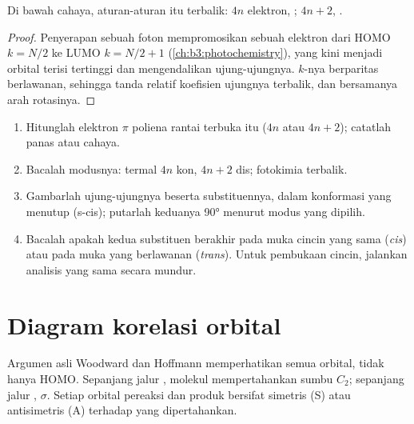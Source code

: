 \begin{proposition}\label{prop:b3:pericyclic:photo-electrocyclic}
Di bawah cahaya, aturan-aturan itu terbalik: $4n$ elektron, ; $4n + 2$, .
\end{proposition}

\begin{proof}
Penyerapan sebuah foton mempromosikan sebuah elektron dari HOMO $k = N/2$ ke LUMO $k = N/2 + 1$
(\cref{ch:b3:photochemistry}), yang kini menjadi orbital terisi tertinggi dan
mengendalikan ujung-ujungnya. $k$-nya berparitas berlawanan, sehingga tanda relatif koefisien
ujungnya terbalik, dan bersamanya arah rotasinya.
\end{proof}

\begin{method}\label{met:b3:pericyclic:predict-stereo}
\begin{enumerate}
  \item Hitunglah elektron $\pi$ poliena rantai terbuka itu ($4n$ atau $4n + 2$); catatlah panas atau
        cahaya.
  \item Bacalah modusnya: termal $4n$ kon, $4n + 2$ dis; fotokimia terbalik.
  \item Gambarlah ujung-ujungnya beserta substituennya, dalam konformasi yang
        menutup (s-cis); putarlah keduanya 90° menurut modus yang dipilih.
  \item Bacalah apakah kedua substituen berakhir pada muka cincin yang sama
        (\textit{cis}) atau pada muka yang berlawanan (\textit{trans}). Untuk pembukaan cincin, jalankan analisis
        yang sama secara mundur.
\end{enumerate}
\end{method}

\section{Diagram korelasi orbital}

Argumen asli Woodward dan Hoffmann memperhatikan semua orbital, tidak hanya
HOMO. Sepanjang jalur , molekul mempertahankan sumbu $C_2$; sepanjang
jalur ,  $\sigma$. Setiap orbital pereaksi dan
produk bersifat simetris (S) atau antisimetris (A) terhadap  yang
dipertahankan.

